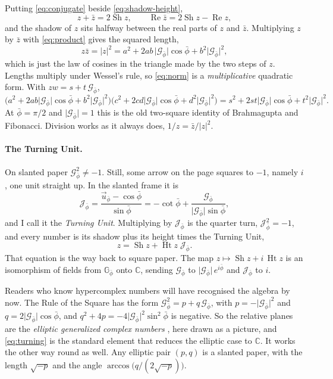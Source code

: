 \documentclass[11pt,a4paper]{article}
\theoremstyle{plain}
\theoremstyle{definition}
\newcommand{\pb}{\bar{\phi}}                     %
\newcommand{\Gp}{\mathcal{G}_{\bar{\phi}}}       %
\newcommand{\up}{\vec{u}_{\bar{\phi}}}           %
\newcommand{\Jp}{\mathcal{J}_{\bar{\phi}}}       %
\newcommand{\GNp}{\mathbb{G}_{\bar{\phi}}}       %
\newcommand{\C}{\mathbb{C}}
\newcommand{\G}{\lvert\Gp\rvert}                 %
\renewcommand{\Re}{\operatorname{Re}}
\DeclareMathOperator{\Sh}{Sh}
\DeclareMathOperator{\Ht}{Ht}
\begin{document}
Putting \eqref{eq:conjugate} beside \eqref{eq:shadow-height},
\[
z + \bar z = 2\Sh z , \qquad \Re\bar z = 2\Sh z - \Re z ,
\]
and the shadow of $z$ sits halfway between the real parts of $z$ and $\bar z$. Multiplying $z$ by $\bar z$ with \eqref{eq:product} gives the squared length,
\begin{equation}\label{eq:norm}
z\bar z = \lvert z\rvert^2 = a^2 + 2ab\,\G\cos\pb + b^2\G^2 ,
\end{equation}
which is just the law of cosines in the triangle made by the two steps of $z$. Lengths multiply under Wessel's rule, so \eqref{eq:norm} is a \emph{multiplicative} quadratic form. With $zw = s + t\,\Gp$,
\[
\bigl(a^2 + 2ab\G\cos\pb + b^2\G^2\bigr)\bigl(c^2 + 2cd\G\cos\pb + d^2\G^2\bigr) = s^2 + 2st\G\cos\pb + t^2\G^2 .
\]
At $\pb = \pi/2$ and $\G = 1$ this is the old two-square identity of Brahmagupta and Fibonacci. Division works as it always does, $1/z = \bar z/\lvert z\rvert^2$.

\paragraph{The Turning Unit.} On slanted paper $\Gp^2 \neq -1$. Still, some arrow on the page squares to $-1$, namely $i$, one unit straight up. In the slanted frame it is
\begin{equation}\label{eq:turning}
\Jp = \frac{\up - \cos\pb}{\sin\pb} = -\cot\pb + \frac{\Gp}{\G\sin\pb} ,
\end{equation}
and I call it the \emph{Turning Unit}. Multiplying by $\Jp$ is the quarter turn, $\Jp^2 = -1$, and every number is its shadow plus its height times the Turning Unit,
\[
z = \Sh z + \Ht z\;\Jp .
\]
That equation is the way back to square paper. The map $z \mapsto \Sh z + i\,\Ht z$ is an isomorphism of fields from $\GNp$ onto $\C$, sending $\Gp$ to $\G\,e^{i\pb}$ and $\Jp$ to $i$.

Readers who know hypercomplex numbers will have recognised the algebra by now. The Rule of the Square has the form $\Gp^2 = p + q\,\Gp$, with $p = -\G^2$ and $q = 2\G\cos\pb$, and $q^2 + 4p = -4\G^2\sin^2\pb$ is negative. So the relative planes are the \emph{elliptic generalized complex numbers} \cite{HarkinHarkin, KantorSolodovnikov, Yaglom}, here drawn as a picture, and \eqref{eq:turning} is the standard element that reduces the elliptic case to $\C$. It works the other way round as well. Any elliptic pair $(p, q)$ is a slanted paper, with the length $\sqrt{-p}$ and the angle $\arccos\bigl(q/(2\sqrt{-p})\bigr)$.
\end{document}
